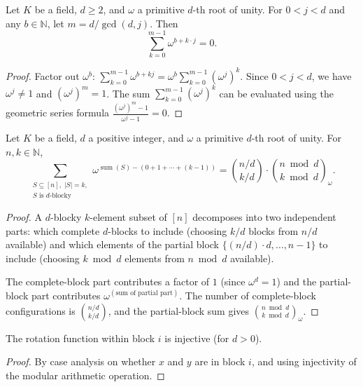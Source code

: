 \begin{lemma}
\label{lem.orbit_sum_eq_zero}
Let $K$ be a field, $d \geq 2$, and $\omega$ a primitive $d$-th root
of unity. For $0 < j < d$ and any $b \in \mathbb{N}$, let
$m = d / \gcd(d, j)$. Then
\[
\sum_{k=0}^{m-1} \omega^{b + k \cdot j} = 0.
\]
\end{lemma}

\begin{proof}
Factor out $\omega^b$:
$\sum_{k=0}^{m-1} \omega^{b + kj} = \omega^b \sum_{k=0}^{m-1} (\omega^j)^k$.
Since $0 < j < d$, we have $\omega^j \neq 1$ and $(\omega^j)^m = 1$.
The sum $\sum_{k=0}^{m-1} (\omega^j)^k$ can be evaluated using the
geometric series formula
$\frac{(\omega^j)^m - 1}{\omega^j - 1} = 0$.
\end{proof}

\begin{lemma}
\label{lem.blocky_sum_eq}
\leanhelper
\leanok
Let $K$ be a field, $d$ a positive integer, and $\omega$ a primitive
$d$-th root of unity. For $n, k \in \mathbb{N}$,
\[
\sum_{\substack{S \subseteq [n],\; |S| = k,\\ S \text{ is $d$-blocky}}}
\omega^{\operatorname{sum}(S) - (0 + 1 + \cdots + (k-1))}
= \binom{n/d}{k/d} \cdot
\binom{n \bmod d}{k \bmod d}_{\omega}.
\]
\end{lemma}

\begin{proof}
A $d$-blocky $k$-element subset of $[n]$ decomposes into two
independent parts: which complete $d$-blocks to include (choosing
$k/d$ blocks from $n/d$ available) and which elements of the partial
block $\{(n/d) \cdot d, \ldots, n-1\}$ to include (choosing
$k \bmod d$ elements from $n \bmod d$ available).

The complete-block part contributes a factor of $1$ (since
$\omega^d = 1$) and the partial-block part contributes
$\omega^{(\text{sum of partial part})}$. The number of
complete-block configurations is $\binom{n/d}{k/d}$, and the
partial-block sum gives
$\binom{n \bmod d}{k \bmod d}_{\omega}$.
\end{proof}

\begin{lemma}
\label{lem.rotateInBlock_injective}
The rotation function within block $i$ is injective (for $d > 0$).
\end{lemma}

\begin{proof}
By case analysis on whether $x$ and $y$ are in block $i$, and using
injectivity of the modular arithmetic operation.
\end{proof}

